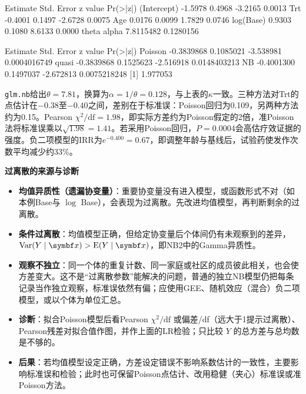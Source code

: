 \begin{routput}
            Estimate Std. Error z value Pr(>|z|)
(Intercept)  -1.5978     0.4968 -3.2165   0.0013
Trt          -0.4001     0.1497 -2.6728   0.0075
Age           0.0176     0.0099  1.7829   0.0746
log(Base)     0.9303     0.1080  8.6133   0.0000
    theta     alpha 
7.8115482 0.1280156 

          Estimate Std. Error   z value     Pr(>|z|)
Poisson -0.3839868  0.1085021 -3.538981 0.0004016749
quasi   -0.3839868  0.1525623 -2.516918 0.0148403213
NB      -0.4001300  0.1497037 -2.672813 0.0075218248
[1] 1.977053
\end{routput}
\texttt{glm.nb}给出$\theta=7.81$，换算为$\alpha=1/\theta=0.128$，与上表的$\kappa$一致。三种方法对Trt的点估计在$-0.38$至$-0.40$之间，差别在于标准误：Poisson回归为0.109，另两种方法约为0.15。Pearson $\chi^2/\mathrm{df}=1.98$，即实际方差约为Poisson假定的2倍，准Poisson法将标准误乘以$\sqrt{1.98}=1.41$。若采用Poisson回归，$P=0.0004$会高估疗效证据的强度。负二项模型的IRR为$e^{-0.400}=0.67$，即调整年龄与基线后，试验药使发作次数平均减少约33\%。

\textbf{过离散的来源与诊断}
\begin{itemize}
\item \textbf{均值异质性（遗漏协变量）}：重要协变量没有进入模型，或函数形式不对（如本例Base与 $\log$ Base），会表现为过离散。先改进均值模型，再判断剩余的过离散。
\item \textbf{条件过离散}：均值模型正确，但给定协变量后个体间仍有未观察到的差异，$\Var(Y\mid\bm x)>\E(Y\mid\bm x)$，即NB2中的Gamma异质性。
\item \textbf{观察不独立}：同一个体的重复计数、同一家庭或社区的成员彼此相关，也会使方差变大。这不是“过离散参数”能解决的问题，普通的独立NB模型仍把每条记录当作独立观察，标准误依然有偏；应使用GEE、随机效应（混合）负二项模型，或以个体为单位汇总。
\item \textbf{诊断}：拟合Poisson模型后看Pearson $\chi^2/\mathrm{df}$ 或偏差/df（远大于1提示过离散）、Pearson残差对拟合值作图，并作上面的LR检验；只比较 $Y$ 的总方差与总均数是不够的。
\item \textbf{后果}：若均值模型设定正确，方差设定错误不影响系数估计的一致性，主要影响标准误和检验；此时也可保留Poisson点估计、改用稳健（夹心）标准误或准Poisson方法。
\end{itemize}
